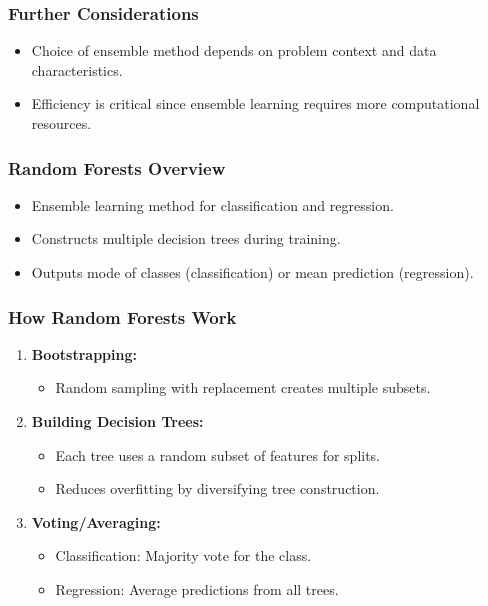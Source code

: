 \documentclass[aspectratio=169]{beamer}
\begin{document}
\begin{frame}[fragile]
    \frametitle{Further Considerations}
    \begin{itemize}
        \item Choice of ensemble method depends on problem context and data characteristics.
        \item Efficiency is critical since ensemble learning requires more computational resources.
    \end{itemize}
\end{frame}

\begin{frame}
    \frametitle{Random Forests Overview}
    \begin{itemize}
        \item Ensemble learning method for classification and regression.
        \item Constructs multiple decision trees during training.
        \item Outputs mode of classes (classification) or mean prediction (regression).
    \end{itemize}
\end{frame}

\begin{frame}
    \frametitle{How Random Forests Work}
    \begin{enumerate}
        \item \textbf{Bootstrapping:} 
            \begin{itemize}
                \item Random sampling with replacement creates multiple subsets.
            \end{itemize}
        \item \textbf{Building Decision Trees:}
            \begin{itemize}
                \item Each tree uses a random subset of features for splits.
                \item Reduces overfitting by diversifying tree construction.
            \end{itemize}
        \item \textbf{Voting/Averaging:} 
            \begin{itemize}
                \item Classification: Majority vote for the class.
                \item Regression: Average predictions from all trees.
            \end{itemize}
    \end{enumerate}
\end{frame}
\end{document}
